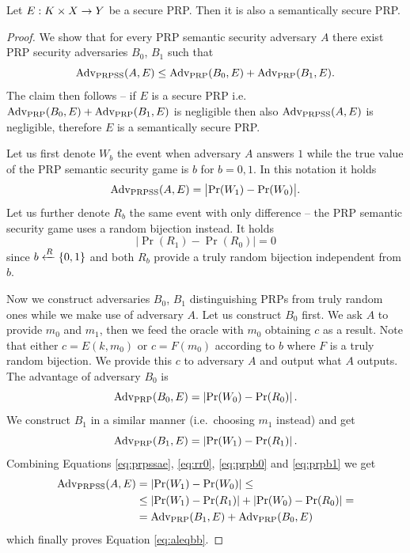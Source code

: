 \begin{thm}
\label{thm:semsecprp}
	Let $E: K\times X\rightarrow Y$ be a secure PRP. Then it is also a semantically secure PRP.
\end{thm}
\begin{proof}
	We show that for every PRP semantic security adversary $A$ there exist PRP security adversaries $B_0$, $B_1$ such that
	\begin{equation}
	\label{eq:aleqbb}
		\operatorname*{Adv_{PRPSS}}(A,E) \leq \operatorname*{Adv_{PRP}}(B_0,E) + \operatorname*{Adv_{PRP}}(B_1,E) .
	\end{equation}
	The claim then follows -- if $E$ is a secure PRP i.e.\ $\operatorname*{Adv_{PRP}}(B_0,E) + \operatorname*{Adv_{PRP}}(B_1,E)$ is negligible then also $\operatorname*{Adv_{PRPSS}}(A,E)$ is negligible, therefore $E$ is a semantically secure PRP.
	
	Let us first denote $W_b$ the event when adversary $A$ answers $1$ while the true value of the PRP semantic security game is $b$ for $b=0,1$. In this notation it holds
	\begin{equation}
	\label{eq:prpssae}
		\operatorname*{Adv_{PRPSS}}(A,E) = \bigl| \Pr(W_1) - \Pr(W_0) \bigr| .
	\end{equation}
	Let us further denote $R_b$ the same event with only difference -- the PRP semantic security game uses a random bijection instead. It holds
	\begin{equation}
	\label{eq:rr0}
		\bigl| \Pr(R_1) - \Pr(R_0) \bigr| = 0
	\end{equation}
	since $b\xleftarrow{R}\{0,1\}$ and both $R_b$ provide a truly random bijection independent from $b$.
	
	Now we construct adversaries $B_0$, $B_1$ distinguishing PRPs from truly random ones while we make use of adversary $A$. Let us construct $B_0$ first. We ask $A$ to provide $m_0$ and $m_1$, then we feed the oracle with $m_0$ obtaining $c$ as a result. Note that either $c=E(k,m_0)$ or $c=F(m_0)$ according to $b$ where $F$ is a truly random bijection. We provide this $c$ to adversary $A$ and output what $A$ outputs. The advantage of adversary $B_0$ is
	\begin{equation}
	\label{eq:prpb0}
		\operatorname*{Adv_{PRP}}(B_0,E) = \left| \Pr(W_0) - \Pr(R_0) \right| .
	\end{equation}
	We construct $B_1$ in a similar manner (i.e.\ choosing $m_1$ instead) and get
	\begin{equation}
	\label{eq:prpb1}
		\operatorname*{Adv_{PRP}}(B_1,E) = \left| \Pr(W_1) - \Pr(R_1) \right| .
	\end{equation}
	Combining Equations \ref{eq:prpssae}, \ref{eq:rr0}, \ref{eq:prpb0} and \ref{eq:prpb1} we get
	\begin{align*}
		\operatorname*{Adv_{PRPSS}}(A,E) &= \left| \Pr(W_1) - \Pr(W_0) \right| \leq \\
		&\leq \left| \Pr(W_1) - \Pr(R_1) \right| + \left| \Pr(W_0) - \Pr(R_0) \right| = \\
		&= \operatorname*{Adv_{PRP}}(B_1,E) + \operatorname*{Adv_{PRP}}(B_0,E)
	\end{align*}
	which finally proves Equation \ref{eq:aleqbb}.
\end{proof}


